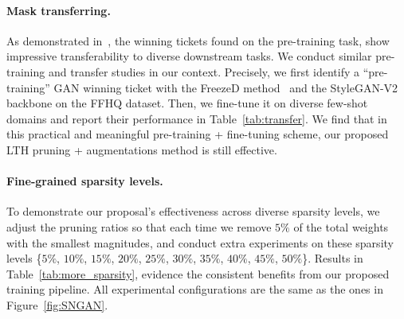 \documentclass{article}
\begin{document}
\begin{table}[t]
\caption{\small FID ($\downarrow$) and IS ($\uparrow$) results of SNGAN with $10\%$ training data of CIFAR-10 at diverse sparsity levels. The setting ``Sparse Tickets + Aug" is reported here.}
\vspace{-2mm}
\label{tab:more_sparsity}
\centering
\small
{}
\vspace{-1.5mm}
\end{table}

\paragraph{Mask transferring.} As demonstrated in~\cite{chen2020lottery,chen2020lottery2}, the winning tickets found on the pre-training task, show impressive transferability to diverse downstream tasks. We conduct similar pre-training and transfer studies in our context. Precisely, we first identify a ``pre-training” GAN winning ticket with the FreezeD method~\cite{zhao2020diffaugment} and the StyleGAN-V2 backbone on the FFHQ dataset. Then, we fine-tune it on diverse few-shot domains and report their performance in Table~\ref{tab:transfer}. We find that in this practical and meaningful pre-training + fine-tuning scheme, our proposed LTH pruning + augmentations method is still effective.

\paragraph{Fine-grained sparsity levels.} To demonstrate our proposal's effectiveness across diverse sparsity levels, we adjust the pruning ratios so that each time we remove $5\%$ of the total weights with the smallest magnitudes, and conduct extra experiments on these sparsity levels \{$5\%$, $10\%$, $15\%$, $20\%$, $25\%$, $30\%$, $35\%$, $40\%$, $45\%$, $50\%$\}. Results in Table~\ref{tab:more_sparsity}, evidence the consistent benefits from our proposed training pipeline. All experimental configurations are the same as the ones in Figure~\ref{fig:SNGAN}.
\end{document}
